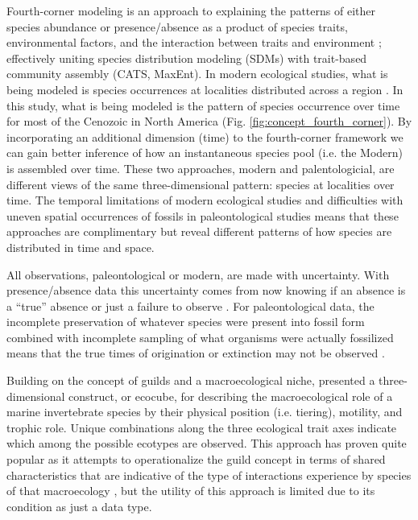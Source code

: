 \documentclass[12pt,letterpaper]{article}
\begin{document}
Fourth-corner modeling is an approach to explaining the patterns of either species abundance or presence/absence as a product of species traits, environmental factors, and the interaction between traits and environment \citep{Brown2014c,Warton2015a,Pollock2012,Jamil2013}; effectively uniting species distribution modeling (SDMs) with trait-based community assembly (CATS, MaxEnt). In modern ecological studies, what is being modeled is species occurrences at localities distributed across a region \citep{Pollock2012,Jamil2013}. In this study, what is being modeled is the pattern of species occurrence over time for most of the Cenozoic in North America (Fig. \ref{fig:concept_fourth_corner}). By incorporating an additional dimension (time) to the fourth-corner framework we can gain better inference of how an instantaneous species pool (i.e. the Modern) is assembled over time. These two approaches, modern and palentologicial, are different views of the same three-dimensional pattern: species at localities over time. The temporal limitations of modern ecological studies and difficulties with uneven spatial occurrences of fossils in paleontological studies means that these approaches are complimentary but reveal different patterns of how species are distributed in time and space.

All observations, paleontological or modern, are made with uncertainty. With presence/absence data this uncertainty comes from now knowing if an absence is a ``true'' absence or just a failure to observe \citep{Royle2008,Royle2005,Foote1999a,Foote2001,Lloyd2011,Wang2016b}. For paleontological data, the incomplete preservation of whatever species were present into fossil form combined with incomplete sampling of what organisms were actually fossilized means that the true times of origination or extinction may not be observed \citep{Foote1999a,Foote2001,Wang2015,Wang2016b}.


Building on the concept of guilds and a macroecological niche, \citet{Bush2007} presented a three-dimensional construct, or ecocube, for describing the macroecological role of a marine invertebrate species by their physical position (i.e. tiering), motility, and trophic role. Unique combinations along the three ecological trait axes indicate which among the possible ecotypes are observed. This approach has proven quite popular as it attempts to operationalize the guild concept in terms of shared characteristics that are indicative of the type of interactions experience by species of that macroecology \citep{Bush2007,Bambach2007,Bush2011,Bush2012b,Novack-Gottshall2007,Villeger2011}, but the utility of this approach is limited due to its condition as just a data type.
\end{document}
